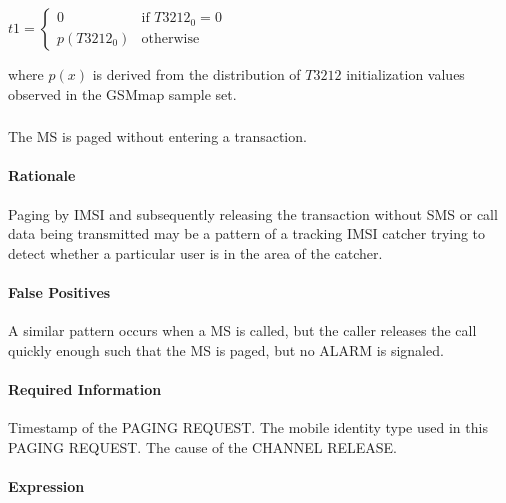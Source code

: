 \documentclass[a4paper,11pt,notitlepage,bigheadings,oneside]{scrartcl}
\begin{document}
$t1 =
\begin{cases}
	0 	 	& \text{if } T3212_0 = 0 \\
	p(T3212_0) 	& \text{otherwise}
\end{cases}$

where $p(x)$ is derived from the distribution of $T3212$ initialization values
observed in the GSMmap sample set.


\subsubsection{}

The MS is paged without entering a transaction.

\paragraph{Rationale}

Paging by IMSI and subsequently releasing the transaction without SMS or call
data being transmitted may be a pattern of a tracking IMSI catcher trying to
detect whether a particular user is in the area of the catcher.

\paragraph{False Positives}

A similar pattern occurs when a MS is called, but the caller releases the call
quickly enough such that the MS is paged, but no ALARM is signaled.

\paragraph{Required Information}

Timestamp of the PAGING REQUEST. The mobile identity type used in this PAGING
REQUEST. The cause of the CHANNEL RELEASE.


\paragraph{Expression}
\end{document}
